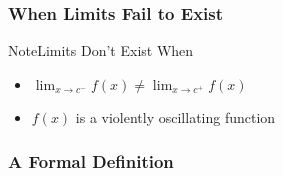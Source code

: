 \documentclass{MathNotes}
\newenvironment{note}[1]{\begin{YellowBox}{Note}{#1}}{\end{YellowBox}}
\begin{document}
\subsubsection{When Limits Fail to Exist}
\begin{note}{Limits Don't Exist When}
    \begin{itemize}
        \item $\lim_{x\to c^-}f(x)\neq \lim_{x\to c^+}f(x)$
        \item $f(x)$ is a violently oscillating function
    \end{itemize}
\end{note}

\newpage
\subsubsection{A Formal Definition}
\end{document}
